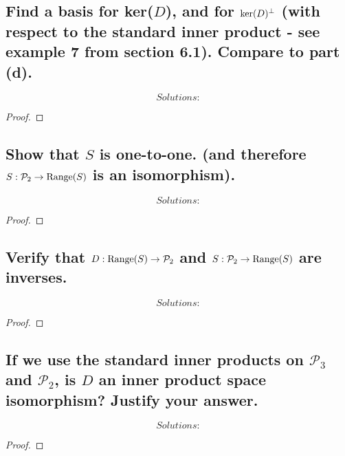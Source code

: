 \documentclass[../main.tex]{subfiles}
\begin{document}
\subsection{Find a basis for ker($D$), and for ${\rm ker}(D)^{\perp}$ (with respect to the standard inner product - see example 7 from section 6.1). Compare to part (d).}
\begin{equation*}
        \boxed{ Solutions:}
\end{equation*}
\begin{proof}
\end{proof}
\subsection{Show that $S$ is one-to-one. (and therefore $S: \mathcal{P}_2 \to {\rm Range}(S)$ is an isomorphism).}
\begin{equation*}
        \boxed{ Solutions:}
\end{equation*}
\begin{proof}
\end{proof}
\subsection{Verify that $D: {\rm Range}(S) \to \mathcal{P}_2$ and $S: \mathcal{P}_2 \to {\rm Range}(S)$ are inverses.}
\begin{equation*}
        \boxed{ Solutions:}
\end{equation*}
\begin{proof}
\end{proof}
\subsection{If we use the standard inner products on $\mathcal{P}_3$ and $\mathcal{P}_2$, is $D$ an inner product space isomorphism? Justify your answer.}
\begin{equation*}
        \boxed{Solutions:}
\end{equation*}
\begin{proof}
\end{proof}
\end{document}

